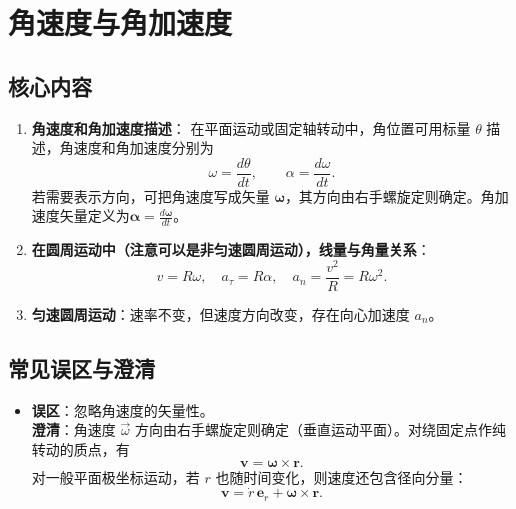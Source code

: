 \newpage

\section{角速度与角加速度}
\subsection{核心内容}
\begin{enumerate}
    \item \textbf{角速度和角加速度描述}：
          在平面运动或固定轴转动中，角位置可用标量 $\theta$ 描述，角速度和角加速度分别为
          \[
              \omega=\frac{d\theta}{dt},\qquad \alpha=\frac{d\omega}{dt}.
          \]
          若需要表示方向，可把角速度写成矢量 $\boldsymbol\omega$，其方向由右手螺旋定则确定。角加速度矢量定义为$\boldsymbol\alpha=\frac{d\boldsymbol\omega}{dt}$。
    \item \textbf{在圆周运动中（注意可以是非匀速圆周运动），线量与角量关系}：
          \[
              v = R\omega,\quad a_\tau = R\alpha,\quad a_n = \frac{v^2}{R} = R\omega^2.
          \]
    \item \textbf{匀速圆周运动}：速率不变，但速度方向改变，存在向心加速度 $a_n$。
\end{enumerate}

\subsection{常见误区与澄清}
\begin{itemize}
    \item \textbf{误区}：忽略角速度的矢量性。\\
          \textbf{澄清}：角速度 $\vec{\omega}$ 方向由右手螺旋定则确定（垂直运动平面）。对绕固定点作纯转动的质点，有
          \[
              \mathbf v=\boldsymbol\omega\times\mathbf r.
          \]
          对一般平面极坐标运动，若 $r$ 也随时间变化，则速度还包含径向分量：
          \[
              \mathbf v=\dot r\,\mathbf e_r+\boldsymbol\omega\times\mathbf r.
          \]
\end{itemize}

